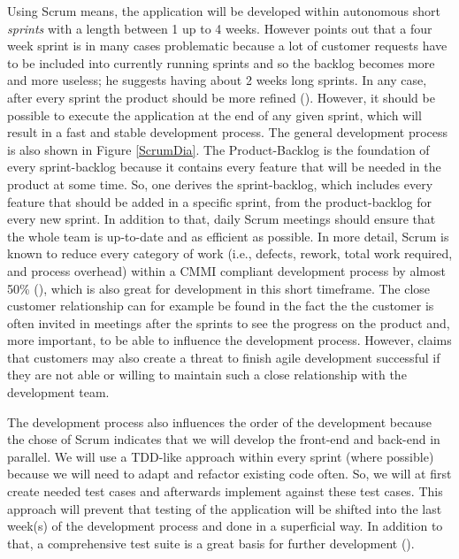 Using Scrum means, the application will be developed within autonomous short \textit{sprints} with a length between 1 up to 4 weeks. However \cite{Ber07} points out that a four week sprint is in many cases problematic because a lot of customer requests have to be included into currently running sprints and so the backlog becomes more and more useless; he suggests having about 2 weeks long sprints. In any case, after every sprint the product should be more refined (\cite{scrum}). However, it should be possible to execute the application at the end of any given sprint, which will result in a fast and stable development process. The general development process is also shown in Figure \ref{ScrumDia}. The Product-Backlog is the foundation of every sprint-backlog because it contains every feature that will be needed in the product at some time. So, one derives the sprint-backlog, which includes every feature that should be added in a specific sprint, from the product-backlog for every new sprint. In addition to that, daily Scrum meetings should ensure that the whole team is up-to-date and as efficient as possible. In more detail, Scrum is known to reduce every category of work (i.e., defects, rework, total work required, and process overhead) within a \ac{CMMI} compliant development process by almost 50\% (\cite{Sut09}), which is also great for development in this short timeframe. The close customer relationship can for example be found in the fact the the customer is often invited in meetings after the sprints to see the progress on the product and, more important, to be able to influence the development process. However, \cite{paulk2002agile} claims that customers may also create a threat to finish agile development successful if they are not able or willing to maintain such a close relationship with the development team.

The development process also influences the order of the development because the chose of Scrum indicates that we will develop the front-end and back-end in parallel. We will use a \ac{TDD}-like approach within every sprint (where possible) because we will need to adapt and refactor existing code often. So, we will at first create needed test cases and afterwards implement against these test cases. This approach will prevent that testing of the application will be shifted into the last week(s) of the development process and done in a superficial way. In addition to that, a comprehensive test suite is a great basis for further development (\cite{max03}).


